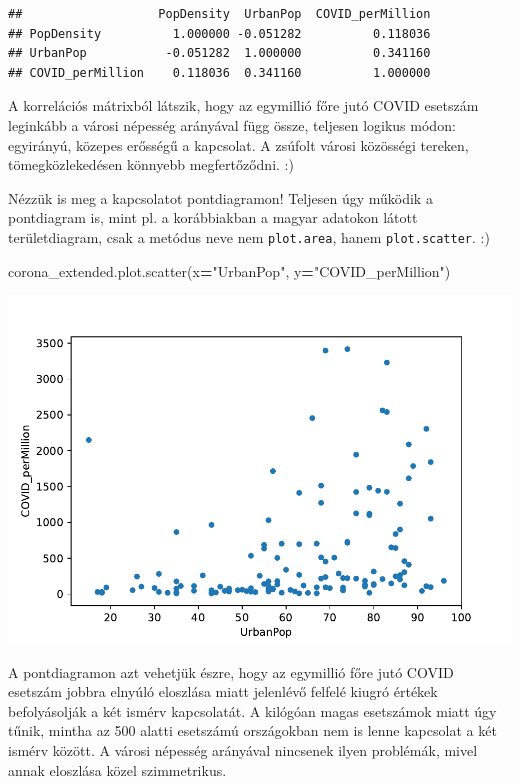 \documentclass[
]{book}
\newenvironment{Shaded}{\begin{snugshade}}{\end{snugshade}}
\newcommand{\NormalTok}[1]{#1}
\newcommand{\OperatorTok}[1]{\textcolor[rgb]{0.81,0.36,0.00}{\textbf{#1}}}
\newcommand{\StringTok}[1]{\textcolor[rgb]{0.31,0.60,0.02}{#1}}
\begin{document}
\begin{verbatim}
##                   PopDensity  UrbanPop  COVID_perMillion
## PopDensity          1.000000 -0.051282          0.118036
## UrbanPop           -0.051282  1.000000          0.341160
## COVID_perMillion    0.118036  0.341160          1.000000
\end{verbatim}

A korrelációs mátrixból látszik, hogy az egymillió főre jutó COVID esetszám leginkább a városi népesség arányával függ össze, teljesen logikus módon: egyirányú, közepes erősségű a kapcsolat. A zsúfolt városi közösségi tereken, tömegközlekedésen könnyebb megfertőződni. :)

Nézzük is meg a kapcsolatot pontdiagramon! Teljesen úgy működik a pontdiagram is, mint pl. a korábbiakban a magyar adatokon látott területdiagram, csak a metódus neve nem \texttt{plot.area}, hanem \texttt{plot.scatter}. :)

\begin{Shaded}
\begin{Highlighting}[]
\NormalTok{corona\_extended.plot.scatter(x}\OperatorTok{=}\StringTok{"UrbanPop"}\NormalTok{, y}\OperatorTok{=}\StringTok{"COVID\_perMillion"}\NormalTok{)}
\end{Highlighting}
\end{Shaded}

\includegraphics{_main_files/figure-latex/unnamed-chunk-124-15.pdf}

A pontdiagramon azt vehetjük észre, hogy az egymillió főre jutó COVID esetszám jobbra elnyúló eloszlása miatt jelenlévő felfelé kiugró értékek befolyásolják a két ismérv kapcsolatát. A kilógóan magas esetszámok miatt úgy tűnik, mintha az 500 alatti esetszámú országokban nem is lenne kapcsolat a két ismérv között.
A városi népesség arányával nincsenek ilyen problémák, mivel annak eloszlása közel szimmetrikus.
\end{document}
